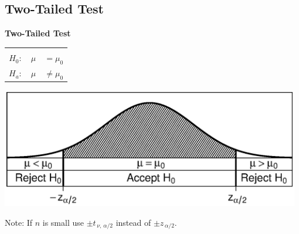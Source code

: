 \documentclass[compress]{beamer}        %
\makeatletter
\newcommand{\tcb}{\textcolor{beamer@blendedblue}}
\makeatother
\begin{document}
\subsection{Two-Tailed Test}
\begin{frame}{\bf \tcb{Two-Tailed Test}}
\begin{center}
\begin{tabular}{|c@{\,\,}c|}
\hline
&\\[-0.4cm]
$H_0: \quad \mu$ & $= \mu_0$ \\[0.2cm]
$H_a: \quad \mu$ &  $\ne \mu_0$ \\[0.1cm]
\hline
\end{tabular}
\end{center}
\begin{center}
\includegraphics[width=0.98\textwidth, trim = 1.5cm 1.6cm 0.7cm 1.5cm, clip]{AcceptRegionTwo}
\end{center}
Note: If $n$ is small use  $\pm t_{\,\nu,\,\alpha/2}$ instead of $\pm z_{\,\alpha/2}$.
\end{frame}
\end{document}
